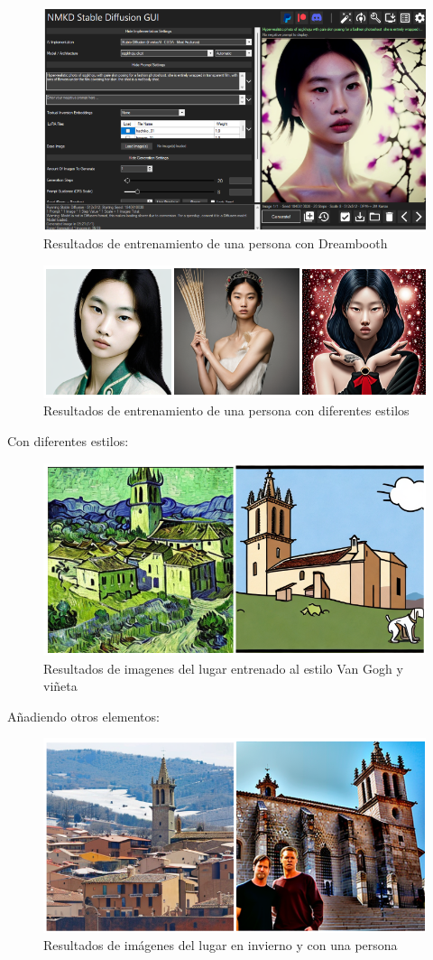\begin{figure}[h]
	\centering
	\includegraphics[width = 0.5
	\textwidth]{Imagenes/Vectorial/hoyeon1.png}
	\caption{Resultados de entrenamiento de una persona con Dreambooth}
	\label{fig:hoyeonsd}
\end{figure}

\begin{figure}[h]
	\centering
	\includegraphics[width = 0.6
	\textwidth]{Imagenes/Vectorial/hoyeon_results.png}
	\caption{Resultados de entrenamiento de una persona con diferentes estilos}
	\label{fig:imagshoyeon}
\end{figure}


Con diferentes estilos:\\

\begin{figure}[!htb]
	\centering
	\includegraphics[width = 0.6
	\textwidth]{Imagenes/Vectorial/colmenar_styles.png}
	\caption{Resultados de imagenes del lugar entrenado al estilo Van Gogh y viñeta}
	\label{fig:colmestyles}
\end{figure}


Añadiendo otros elementos:\\


\begin{figure}[!htb]
	\centering
	\includegraphics[width = 0.6
	\textwidth]{Imagenes/Vectorial/colmenar_elements.png}
	\caption{Resultados de imágenes del lugar en invierno y con una persona}
	\label{fig:elementscolme}
\end{figure}


